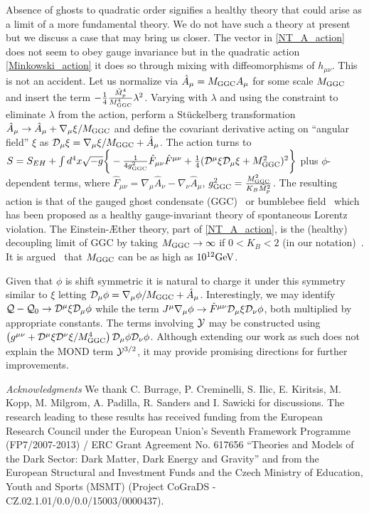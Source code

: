 \documentclass[twocolumn,prl,preprintnumbers,amsmath,amssymb,nofootinbib]{revtex4-2}
\newcommand{\GeV}{\ensuremath{{\rm GeV}}}
\newcommand{\ggc}{g_{{\rm GGC}}}
\newcommand{\MC}{M_{{\rm GGC}}}
\newcommand{\Ah}{{A}}
\newcommand{\Jh}{{J}}
\newcommand{\AC}{\hat{A}}
\newcommand{\FC}{\hat{F}}
\newcommand{\Mpt}{\tilde{M}_p}
\newcommand{\Dcal}{{\cal D}}
\newcommand{\Qcal}{{\cal Q}}
\newcommand{\Ycal}{{\cal Y}}
\newcommand{\metM}{\ensuremath{g}}
\newcommand{\KB}{\ensuremath{K_{B}}}
\begin{document}
Absence of ghosts to quadratic order signifies a healthy theory that could arise as a limit
of a more fundamental theory.  We do not have such a theory at present but we discuss a case that may bring us closer.
The vector in \eqref{NT_A_action} does not seem to obey gauge invariance but in the quadratic action \eqref{Minkowski_action} it does so through mixing with diffeomorphisms of $h_{\mu\nu}$.
This is not an accident.  Let us normalize via $\AC_\mu = \MC \Ah_\mu$ for some scale $\MC$ and insert the term $ -\frac{1}{4}\frac{\Mpt^4}{\MC^4}\lambda^2$.
Varying with $\lambda$ and using the constraint to eliminate $\lambda$ from the action, perform a St\"{u}ckelberg transformation $\AC_\mu \rightarrow \AC_\mu + \nabla_\mu \xi/\MC$
and define the covariant derivative acting on ``angular field'' $\xi$ as $\Dcal_\mu\xi = \nabla_\mu \xi/\MC +  \AC_\mu$. The action turns to
 $S  = S_{EH} +  \int d^4x \sqrt{-\metM} \bigg\{  - \frac{1}{4\ggc^2}  \FC_{\mu\nu}  \FC^{\mu\nu}  
+  \frac{1}{4}  (\Dcal^\mu \xi \Dcal_\mu \xi + \MC^2)^2  \bigg\}
$
plus $\phi$-dependent terms, 
where $\FC_{\mu\nu} = \nabla_\mu \AC_\nu - \nabla_\nu \AC_\mu$, $\ggc^2 = \frac{\MC^2}{\KB \Mpt^2}$. %
The resulting action is that of the gauged ghost condensate (GGC)~\cite{Cheng:2006us} or bumblebee field~\cite{Kostelecky:1988zi,Kostelecky:1989jw} which has been proposed as a healthy gauge-invariant theory 
of spontaneous Lorentz violation.  The Einstein-{\AE}ther theory, part of \eqref{NT_A_action}, is the (healthy) decoupling limit of GGC by taking $\MC\rightarrow \infty$
 if $0<\KB<2$ (in our notation)~\cite{Cheng:2006us}.  It is argued~\cite{Cheng:2006us} that $\MC$ can be as high as $10^{12}\GeV$. 

Given that $\phi$ is shift symmetric it is natural to charge it under this symmetry similar to $\xi$  letting
$\Dcal_\mu \phi = \nabla_\mu\phi/\MC +  \AC_\mu$. Interestingly, we may identify $\Qcal - \Qcal_0 \rightarrow \Dcal^\mu\xi \Dcal_\mu \phi$ while
the term $\Jh^\mu \nabla_\mu \phi \rightarrow \FC^{\mu\nu} \Dcal_\mu \xi  \Dcal_\nu \phi$, both multiplied by appropriate constants.
The terms involving $\Ycal$ may be constructed using $\left(g^{\mu\nu} + \Dcal^\mu \xi \Dcal^\nu \xi/\MC^4\right)\Dcal_\mu\phi \Dcal_\nu \phi$.
Although extending our work as such does not explain the MOND term $\Ycal^{3/2}$, it may provide promising directions for further improvements.


\begin{acknowledgments}
{\it Acknowledgments} We thank C. Burrage, P. Creminelli, S. Ilic, E. Kiritsis, M. Kopp, M. Milgrom, A. Padilla, R. Sanders and I. Sawicki for discussions. 
The research leading to these results has received funding from the European Research Council under the European Union's 
Seventh Framework Programme (FP7/2007-2013) / ERC Grant Agreement No. 617656 ``Theories
 and Models of the Dark Sector: Dark Matter, Dark Energy and Gravity''  and from the European Structural and Investment Funds
and the Czech Ministry of Education, Youth and Sports (MSMT) (Project CoGraDS - CZ.02.1.01/0.0/0.0/15003/0000437).   
\end{acknowledgments}




\end{document}
